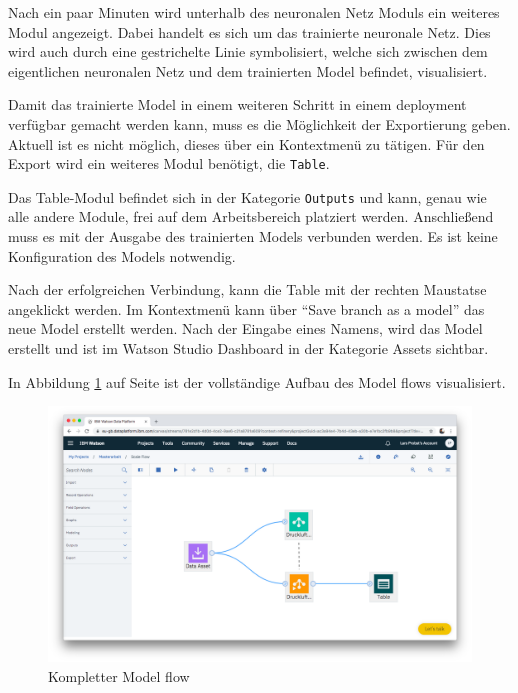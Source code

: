 Nach ein paar Minuten wird unterhalb des neuronalen Netz Moduls ein weiteres Modul angezeigt. Dabei handelt es sich um
das trainierte neuronale Netz. Dies wird auch durch eine gestrichelte Linie symbolisiert, welche sich zwischen dem
eigentlichen neuronalen Netz und dem trainierten Model befindet, visualisiert.

Damit das trainierte Model in einem weiteren Schritt in einem deployment verfügbar gemacht werden kann, muss es die
Möglichkeit der Exportierung geben. Aktuell ist es nicht möglich, dieses über ein Kontextmenü zu tätigen. Für den Export
wird ein weiteres Modul benötigt, die \texttt{Table}.

Das Table-Modul befindet sich in der Kategorie \texttt{Outputs} und kann, genau wie alle andere Module, frei auf dem
Arbeitsbereich platziert werden. Anschließend muss es mit der Ausgabe des trainierten Models verbunden werden. Es ist
keine Konfiguration des Models notwendig.

Nach der erfolgreichen Verbindung, kann die Table mit der rechten Maustatse angeklickt werden. Im Kontextmenü kann über
\enquote{Save branch as a model} das neue Model erstellt werden. Nach der Eingabe eines Namens, wird das Model erstellt
und ist im Watson Studio Dashboard in der Kategorie Assets sichtbar.

In Abbildung \ref{fig:umsetzung_model_flow} auf Seite \pageref{fig:umsetzung_model_flow} ist der vollständige Aufbau des
Model flows visualisiert.

\begin{figure}[h]
    \centering
    \includegraphics[scale=0.26]{images/kapitel_3/umsetzung_model_flow.png}
    \caption{Kompletter Model flow}
    \label{fig:umsetzung_model_flow}
\end{figure}

